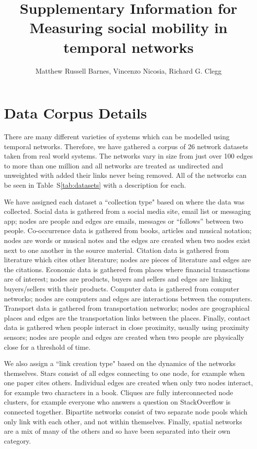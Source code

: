 \documentclass[10pt]{article}
\title{Supplementary Information for Measuring social mobility in temporal networks}
\author{Matthew Russell Barnes, Vincenzo Nicosia, Richard G. Clegg}
\begin{document}
\maketitle
\section{Data Corpus Details}
\label{subsec:data_corpus_intro}
There are many different varieties of systems which can be modelled using temporal networks. Therefore, we have gathered a corpus of 26 network datasets taken from real world systems. The networks vary in size from just over 100 edges to more than one million and all networks are treated as undirected and unweighted with added their links never being removed. All of the networks can be seen in Table~S\ref{tab:datasets} with a description for each. 

We have assigned each dataset a ``collection type" based on where the data was collected. Social data is gathered from a social media site, email list or messaging app; nodes are people and edges are emails, messages or ``follows'' between two people. Co-occurrence data is gathered from books, articles and musical notation; nodes are words or musical notes and the edges are created when two nodes exist next to one another in the source material. Citation data is gathered from literature which cites other literature; nodes are pieces of literature and edges are the citations. Economic data is gathered from places where financial transactions are of interest; nodes are products, buyers and sellers and edges are linking buyers/sellers with their products. Computer data is gathered from computer networks; nodes are computers and edges are interactions between the computers. Transport data is gathered from transportation networks; nodes are geographical places and edges are the transportation links between the places. Finally, contact data is gathered when people interact in close proximity, usually using proximity sensors; nodes are people and edges are created when two people are physically close for a threshold of time. 

We also assign a ``link creation type" based on the dynamics of the networks themselves. Stars consist of all edges connecting to one node, for example when one paper cites others. Individual edges are created when only two nodes interact, for example two characters in a book. Cliques are fully interconnected node clusters, for example everyone who answers a question on StackOverflow is connected together. Bipartite networks consist of two separate node pools which only link with each other, and not within themselves. Finally, spatial networks are a mix of many of the others and so have been separated into their own category. 
\end{document}
